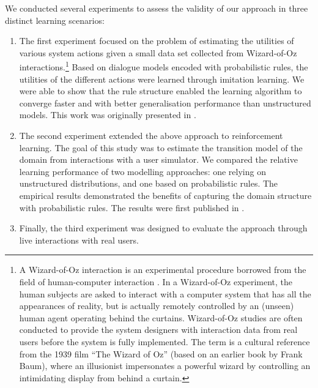 We conducted several experiments to assess the validity of our approach in three distinct learning scenarios: \begin{enumerate} %
\item The first experiment focused on the problem of estimating the utilities of various system actions given a small data set collected from Wizard-of-Oz interactions.\footnote{A Wizard-of-Oz interaction is an experimental procedure borrowed from the field of human-computer interaction \citep{woz93}. In a Wizard-of-Oz experiment, the human subjects are asked to interact with a computer system that has all the appearances of reality, but is actually remotely controlled by an (unseen) human agent operating behind the curtains.  Wizard-of-Oz studies are often conducted to provide the system designers with interaction data from real users before the system is fully implemented.  The term is a cultural reference from the 1939 film ``The Wizard of Oz'' (based on an earlier book by Frank Baum), where an illusionist impersonates a powerful wizard by controlling an intimidating display from behind a curtain.}  Based on dialogue models encoded with probabilistic rules, the utilities of the different actions were learned through imitation learning. We were able to show that the rule structure enabled the learning algorithm to converge faster and with better generalisation performance than unstructured models. This work was originally presented in \citep{rulebasedmodels-sigdial2012}. 
\item The second experiment extended the above approach to reinforcement learning. The goal of this study was to estimate the transition model of the domain from interactions with a user simulator. We compared the relative learning performance of two modelling approaches: one relying on unstructured distributions, and one based on probabilistic rules. The empirical results demonstrated the benefits of capturing the domain structure with probabilistic rules. The results were first published in \citep{interspeech2013}. 
\item Finally, the third experiment was designed to evaluate the approach through live interactions with real users.    \vspace{4cm}
\end{enumerate}

